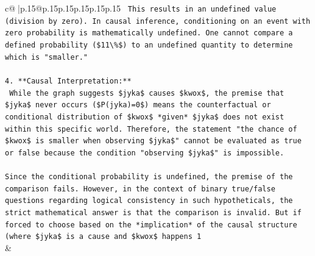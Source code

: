 \documentclass{article}
\begin{document}
{\begin{supertabular}{c@{$\;$}|p{.15\linewidth}@{}p{.15\linewidth}p{.15\linewidth}p{.15\linewidth}p{.15\linewidth}p{.15\linewidth}}
{{{\texttt{    This results in an undefined value (division by zero). In causal inference, conditioning on an event with zero probability is mathematically undefined. One cannot compare a defined probability (\$11\textbackslash{}\%\$) to an undefined quantity to determine which is "smaller."} \\
\\ 
\texttt{4.  **Causal Interpretation:**} \\
\texttt{    While the graph suggests \$jyka\$ causes \$kwox\$, the premise that \$jyka\$ never occurs (\$P(jyka)=0\$) means the counterfactual or conditional distribution of \$kwox\$ *given* \$jyka\$ does not exist within this specific world. Therefore, the statement "the chance of \$kwox\$ is smaller when observing \$jyka\$" cannot be evaluated as true or false because the condition "observing \$jyka\$" is impossible.} \\
\\ 
\texttt{Since the conditional probability is undefined, the premise of the comparison fails. However, in the context of binary true/false questions regarding logical consistency in such hypotheticals, the strict mathematical answer is that the comparison is invalid. But if forced to choose based on the *implication* of the causal structure (where \$jyka\$ is a cause and \$kwox\$ happens 1} \\
            }
        }
    }
    & \\ \\


\end{supertabular}}
\end{document}
